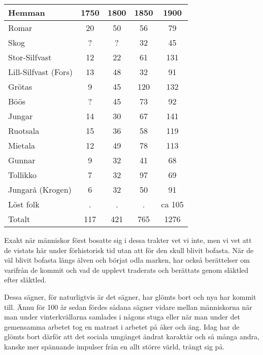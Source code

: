 \begin{center}
  \begin{tabular}{lcccc}
    \hline
    Hemman & 1750 & 1800 & 1850 & 1900 \\ \hline
    Romar & 20 & 50 & 56 & 79 \\
    Skog & ? & ? & 32 & 45 \\
    Stor-Silfvast & 12 & 22 & 61 & 131 \\
    Lill-Silfvast (Fors) & 13 & 48 & 32 & 91 \\
    Grötas & 9 & 45 & 120 & 132 \\
    Böös & ? & 45 & 73 & 92 \\
    Jungar & 14 & 30 & 67 & 141 \\
    Ruotsala & 15 & 36 & 58 & 119 \\
    Mietala & 12 & 49 & 78 & 113 \\
    Gunnar & 9 & 32 & 41 & 68 \\
    Tollikko & 7 & 32 & 97 & 69 \\
    Jungarå (Krogen) & 6 & 32 & 50 & 91 \\
    Löst folk & . & . & . & ca 105 \\ \hline
    Totalt & 117 & 421 & 765 & 1276 \\
    \hline
  \end{tabular}
\end{center}


Exakt när människor först bosatte sig i dessa trakter vet vi inte, men vi vet att de vistats här under förhistorisk tid utan att för den skull blivit bofasta. När de väl blivit bofasta längs älven och börjat odla marken, har också berättelser om varifrån de kommit och vad de upplevt traderats och berättats genom släktled efter släktled.

Dessa sägner, för naturligtvis är det sägner, har glömts bort och nya har kommit till. Ännu för 100 år sedan fördes sådana sägner vidare mellan människorna när man under vinterkvällarna samlades i någons stuga eller när man under det gemensamma arbetet tog en matrast i arbetet på åker och äng. Idag har de glömts bort därför att det sociala umgänget ändrat karaktär och så många andra, kanske mer spännande impulser från en allt större värld, trängt sig på.
